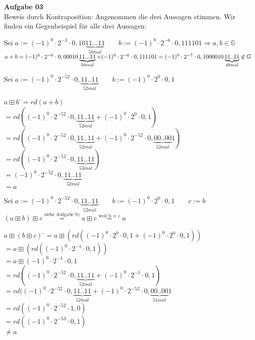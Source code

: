 \documentclass[a4paper,10pt]{article}
\begin{document}
	\parindent0pt
	\textbf{Aufgabe 03}\\
	
	Beweis durch Kontraposition: Angenommen die drei Aussagen stimmen. Wir finden ein Gegenbeispiel für alle drei Aussagen:\\
	
	\begin{compactenum} [a)]
		\item Sei $ a := (-1)^0\cdot2^{-3}\cdot0,10\underbrace{11...11}_{50 mal} \qquad b := (-1)^0\cdot2^{-6}\cdot0,111101 \Longrightarrow a, b \in \mathbb{G}$\\
		$ a+b = (-1)^0\cdot2^{-6}\cdot0,00010\underbrace{11...11}_{50 mal} + (-1)^0\cdot2^{-6}\cdot0,111101 \\
		= (-1)^0\cdot2^{-7}\cdot0,1000010\underbrace{11..11}_{49 mal} \not\in \mathbb{G}$
		\item  Sei $ a:= (-1)^0\cdot2^{-52}\cdot0,\underbrace{11..11}_{52 mal} \qquad b:= (-1)^0\cdot2^0\cdot0,1$\\
		\begin{tabbing}
			$ a\boxplus b$ \=$= rd(a+b)$ \\
			\>$ =rd((-1)^0\cdot2^{-52}\cdot0,\underbrace{11..11}_{52 mal}+(-1)^0\cdot2^0\cdot0,1) $ \\
			\>$ =rd((-1)^0\cdot2^{-52}\cdot0,\underbrace{11..11}_{52 mal}+(-1)^0\cdot2^{-52}\cdot0,\underbrace{00..00}_{52 mal}1) $ \\
			\>$ =rd((-1)^0\cdot2^{-52}\cdot0,\underbrace{11..11}_{53 mal})$\\
			\>$ =(-1)^0\cdot2^{-52}\cdot0,\underbrace{11..11}_{52 mal}$\\
			\>$ =a $
		\end{tabbing}
		\item Sei $ a:= (-1)^0\cdot2^{-52}\cdot0,\underbrace{11..11}_{52 mal} \qquad b:= (-1)^0\cdot2^0\cdot0,1 \qquad c:= b $\\
		$ (a\boxplus b) \boxplus c \overset{\text{siehe Aufgabe b)}}{=} a \boxplus c \overset{\text{weil b $\equiv$ c}}{=} a$\\
		\begin{tabbing}
			$ a\boxplus (b\boxplus c) $ \=$ = a \boxplus (rd((-1)^0\cdot2^0\cdot0,1+(-1)^0\cdot2^0\cdot0,1))$\\
			\> $ =a \boxplus (rd((-1)^0\cdot2^{-1}\cdot0,1)) $\\
			\> $ =a \boxplus (-1)^0\cdot2^{-1}\cdot0,1 $\\
			\> $ =rd((-1)^0\cdot2^{-52}\cdot0,\underbrace{11..11}_{52 mal}+(-1)^0\cdot2^{-1}\cdot0,1) $\\
			\> $ =rd((-1)^0\cdot2^{-52}\cdot0,\underbrace{11..11}_{52 mal}+(-1)^0\cdot2^{-52}\cdot0,\underbrace{00..00}_{51 mal}1 $\\
			\> $ =rd((-1)^0\cdot2^{-52}\cdot1,0) $ \\
			\> $ =rd((-1)^0\cdot2^{-53}\cdot0,1) $\\
			\> $ \neq a $
		\end{tabbing}
	\end{compactenum}
\end{document}
